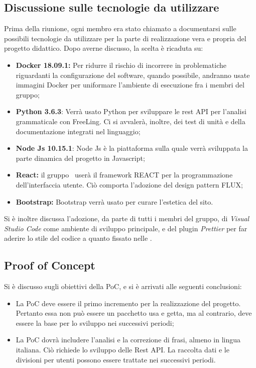 \documentclass[a4paper, oneside, openany, dvipsnames, table]{article}
\begin{document}
\subsection{Discussione sulle tecnologie da utilizzare}
Prima della riunione, ogni membro era stato chiamato a documentarsi sulle possibili tecnologie da utilizzare per la parte di realizzazione vera e propria del progetto didattico. Dopo averne discusso, la scelta è ricaduta su:
\begin{itemize}
	\item \textbf{Docker 18.09.1:} Per ridurre il rischio di incorrere in problematiche riguardanti la configurazione del software, quando possibile, andranno usate immagini Docker per uniformare l'ambiente di esecuzione fra i membri del gruppo;
	\item \textbf{Python 3.6.3}: Verrà usato Python per sviluppare le rest API per l'analisi grammaticale con FreeLing. Ci si avvalerà, inoltre, dei test di unità e della documentazione integrati nel linguaggio;
	\item \textbf{Node Js 10.15.1}: Node Js è la piattaforma sulla quale verrà sviluppata la parte dinamica del progetto in Javascript;
	\item \textbf{React:} il gruppo \gruppo \ userà il framework REACT per la programmazione dell'interfaccia utente. Ciò comporta l'adozione del design pattern FLUX;
	\item \textbf{Bootstrap:} Bootstrap verrà usato per curare l'estetica del sito.
\end{itemize}

Si è inoltre discussa l'adozione, da parte di tutti i membri del gruppo, di \textit{Visual Studio Code} come ambiente di sviluppo principale, e del plugin \textit{Prettier} per far aderire lo stile del codice a quanto fissato nelle \NdP .

\subsection{Proof of Concept}
Si è discusso sugli obiettivi della PoC, e si è arrivati alle seguenti conclusioni:
\begin{itemize}
	\item La PoC deve essere il primo incremento per la realizzazione del progetto. Pertanto essa non può essere un pacchetto usa e getta, ma al contrario, deve essere la base per lo sviluppo nei successivi periodi;
	\item La PoC dovrà includere l'analisi e la correzione di frasi, almeno in lingua italiana. Ciò richiede lo sviluppo delle Rest API. La raccolta dati e le divisioni per utenti possono essere trattate nei successivi periodi.
\end{itemize}
	
\end{document}
